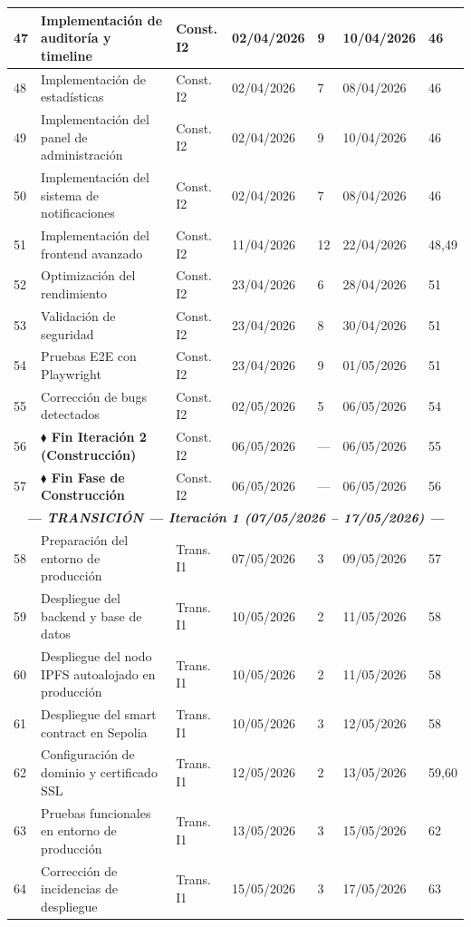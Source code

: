 \documentclass[11pt, a4paper]{article}
\begin{document}
\begin{longtable}{|p{0.6cm}|p{5.2cm}|p{2.5cm}|p{1.9cm}|p{0.9cm}|p{1.9cm}|p{1.4cm}|}
\hline
47 & Implementación de auditoría y timeline & Const. I2 & 02/04/2026 & 9 & 10/04/2026 & 46 \\
\hline
48 & Implementación de estadísticas & Const. I2 & 02/04/2026 & 7 & 08/04/2026 & 46 \\
\hline
49 & Implementación del panel de administración & Const. I2 & 02/04/2026 & 9 & 10/04/2026 & 46 \\
\hline
50 & Implementación del sistema de notificaciones & Const. I2 & 02/04/2026 & 7 & 08/04/2026 & 46 \\
\hline
51 & Implementación del frontend avanzado & Const. I2 & 11/04/2026 & 12 & 22/04/2026 & 48,49 \\
\hline
52 & Optimización del rendimiento & Const. I2 & 23/04/2026 & 6 & 28/04/2026 & 51 \\
\hline
53 & Validación de seguridad & Const. I2 & 23/04/2026 & 8 & 30/04/2026 & 51 \\
\hline
54 & Pruebas E2E con Playwright & Const. I2 & 23/04/2026 & 9 & 01/05/2026 & 51 \\
\hline
55 & Corrección de bugs detectados & Const. I2 & 02/05/2026 & 5 & 06/05/2026 & 54 \\
\hline
56 & \textbf{$\blacklozenge$ Fin Iteración 2 (Construcción)} & Const. I2 & 06/05/2026 & --- & 06/05/2026 & 55 \\
\hline
57 & \textbf{$\blacklozenge$ Fin Fase de Construcción} & Const. I2 & 06/05/2026 & --- & 06/05/2026 & 56 \\
\hline
\multicolumn{7}{|c|}{\textit{\textbf{--- TRANSICIÓN --- Iteración 1 (07/05/2026 -- 17/05/2026) ---}}} \\
\hline
58 & Preparación del entorno de producción & Trans. I1 & 07/05/2026 & 3 & 09/05/2026 & 57 \\
\hline
59 & Despliegue del backend y base de datos & Trans. I1 & 10/05/2026 & 2 & 11/05/2026 & 58 \\
\hline
60 & Despliegue del nodo IPFS autoalojado en producción & Trans. I1 & 10/05/2026 & 2 & 11/05/2026 & 58 \\
\hline
61 & Despliegue del smart contract en Sepolia & Trans. I1 & 10/05/2026 & 3 & 12/05/2026 & 58 \\
\hline
62 & Configuración de dominio y certificado SSL & Trans. I1 & 12/05/2026 & 2 & 13/05/2026 & 59,60 \\
\hline
63 & Pruebas funcionales en entorno de producción & Trans. I1 & 13/05/2026 & 3 & 15/05/2026 & 62 \\
\hline
64 & Corrección de incidencias de despliegue & Trans. I1 & 15/05/2026 & 3 & 17/05/2026 & 63 \\

\end{longtable}
\end{document}

